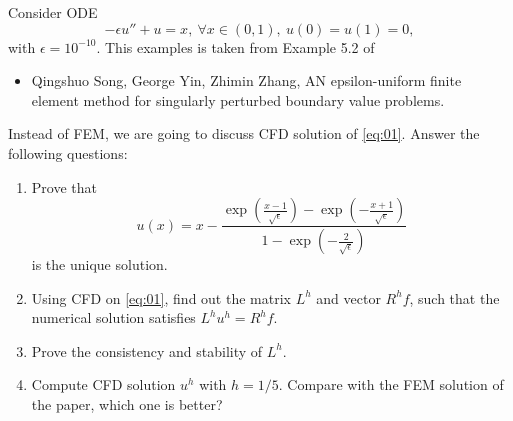 \documentclass{article}
\begin{document}
Consider ODE
\begin{equation}\label{eq:01}
 - \epsilon u'' + u = x, \ \forall x\in (0,1), \ u(0) = u(1) = 0,
\end{equation}
with $\epsilon = 10^{-10}$. This examples is taken from Example 5.2 of 
\begin{itemize}
 \item Qingshuo Song, George Yin, Zhimin Zhang, AN epsilon-uniform finite element method for singularly perturbed boundary value problems.
\end{itemize}
Instead of FEM, we are going to discuss CFD solution of \eqref{eq:01}.
Answer the following questions:
\begin{enumerate}
 \item Prove that 
 $$u(x) = x - \frac{\exp(\frac{x-1}{\sqrt \epsilon}) -  \exp(- \frac{x +1}{\sqrt \epsilon})}{ 1 - \exp(-\frac{2}{\sqrt \epsilon})}$$
 is the unique solution.
 \item Using CFD on \eqref{eq:01}, find out the matrix $L^{h}$ and vector $R^{h} f$, such that the numerical solution satisfies $L^{h} u^{h} = R^{h} f$.
 \item Prove the consistency and stability of $L^{h}$.
 \item Compute CFD solution $u^{h}$ with $h = 1/5$. Compare with the FEM solution of the paper, which one is better?
 
\end{enumerate}
\end{document}
